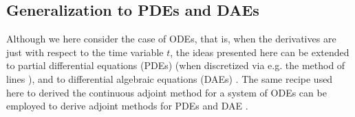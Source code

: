 


\subsection{Generalization to PDEs and DAEs}

Although we here consider the case of ODEs, that is, when the derivatives are just with respect to the time variable $t$, the ideas presented here can be extended to partial differential equations (PDEs) (when discretized via e.g. the method of lines \cite{ascher2008numerical}), and to differential algebraic equations (DAEs) \cite{hairer-solving-2}.
The same recipe used here to derived the continuous adjoint method for a system of ODEs can be employed to derive adjoint methods for PDEs \cite{Giles_Pierce_2000} and DAE \cite{Cao_Li_Petzold_2002}. 



